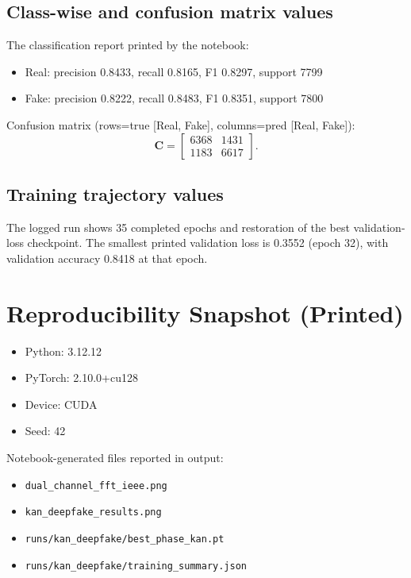 \documentclass[conference]{IEEEtran}
\begin{document}
\subsection{Class-wise and confusion matrix values}
The classification report printed by the notebook:
\begin{itemize}
    \item Real: precision 0.8433, recall 0.8165, F1 0.8297, support 7799
    \item Fake: precision 0.8222, recall 0.8483, F1 0.8351, support 7800
\end{itemize}

Confusion matrix (rows=true [Real, Fake], columns=pred [Real, Fake]):
\begin{equation}
\mathbf{C}=\begin{bmatrix}
6368 & 1431 \\
1183 & 6617
\end{bmatrix}.
\end{equation}

\subsection{Training trajectory values}
The logged run shows 35 completed epochs and restoration of the best validation-loss checkpoint. The smallest printed validation loss is 0.3552 (epoch 32), with validation accuracy 0.8418 at that epoch.

\section{Reproducibility Snapshot (Printed)}
\begin{itemize}
    \item Python: 3.12.12
    \item PyTorch: 2.10.0+cu128
    \item Device: CUDA
    \item Seed: 42
\end{itemize}

Notebook-generated files reported in output:
\begin{itemize}
    \item \texttt{dual\_channel\_fft\_ieee.png}
    \item \texttt{kan\_deepfake\_results.png}
    \item \texttt{runs/kan\_deepfake/best\_phase\_kan.pt}
    \item \texttt{runs/kan\_deepfake/training\_summary.json}
\end{itemize}
\end{document}
